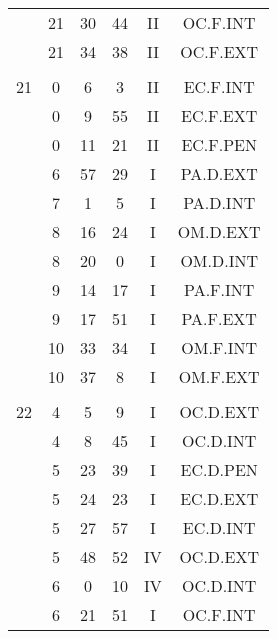 \documentclass[12pt, a4paper]{article}
\begin{document}
\begin{multicols}{3}
{\begin{tabular}{c c c c c c}
	 	 	 	 & 21 & 30 & 44 & II & OC.F.INT\\%
	 	 	 	 & 21 & 34 & 38 & II & OC.F.EXT\\%
	 	 	 	 & & & & & \\%
	 	 	 	21 & 0 & 6 & 3 & II & EC.F.INT\\%
	 	 	 	 & 0 & 9 & 55 & II & EC.F.EXT\\%
	 	 	 	 & 0 & 11 & 21 & II & EC.F.PEN\\%
	 	 	 	 & 6 & 57 & 29 & I & PA.D.EXT\\%
	 	 	 	 & 7 & 1 & 5 & I & PA.D.INT\\%
	 	 	 	 & 8 & 16 & 24 & I & OM.D.EXT\\%
	 	 	 	 & 8 & 20 & 0 & I & OM.D.INT\\%
	 	 	 	 & 9 & 14 & 17 & I & PA.F.INT\\%
	 	 	 	 & 9 & 17 & 51 & I & PA.F.EXT\\%
	 	 	 	 & 10 & 33 & 34 & I & OM.F.INT\\%
	 	 	 	 & 10 & 37 & 8 & I & OM.F.EXT\\%
	 	 	 	 & & & & & \\%
	 	 	 	22 & 4 & 5 & 9 & I & OC.D.EXT\\%
	 	 	 	 & 4 & 8 & 45 & I & OC.D.INT\\%
	 	 	 	 & 5 & 23 & 39 & I & EC.D.PEN\\%
	 	 	 	 & 5 & 24 & 23 & I & EC.D.EXT\\%
	 	 	 	 & 5 & 27 & 57 & I & EC.D.INT\\%
	 	 	 	 & 5 & 48 & 52 & IV & OC.D.EXT\\%
	 	 	 	 & 6 & 0 & 10 & IV & OC.D.INT\\%
	 	 	 	 & 6 & 21 & 51 & I & OC.F.INT\\%

\end{tabular}}
\end{multicols}
\end{document}
